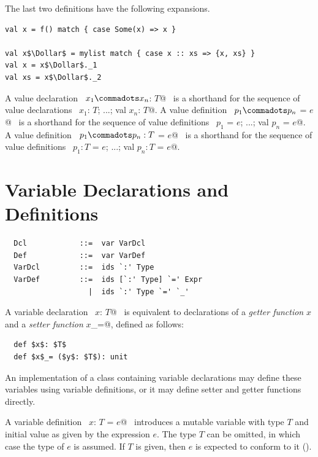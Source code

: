 The last two definitions have the following expansions.
\begin{lstlisting}
val x = f() match { case Some(x) => x }

val x$\Dollar$ = mylist match { case x :: xs => {x, xs} }
val x = x$\Dollar$._1 
val xs = x$\Dollar$._2 
\end{lstlisting}

A value declaration ~\lstinline@val $x_1 \commadots x_n$: $T$@~
is a
shorthand for the sequence of value declarations
~\lstinline@val $x_1$: $T$; ...; val $x_n$: $T$@.
A value definition ~\lstinline@val $p_1 \commadots p_n$ = $e$@~
is a
shorthand for the sequence of value definitions
~\lstinline@val $p_1$ = $e$; ...; val $p_n$ = $e$@.
A value definition ~\lstinline@val $p_1 \commadots p_n: T$ = $e$@~
is a
shorthand for the sequence of value definitions
~\lstinline@val $p_1: T$ = $e$; ...; val $p_n: T$ = $e$@.

\section{Variable Declarations and Definitions}
\label{sec:vardef}

\syntax\begin{lstlisting}
  Dcl            ::=  var VarDcl
  Def            ::=  var VarDef
  VarDcl         ::=  ids `:' Type
  VarDef         ::=  ids [`:' Type] `=' Expr
                   |  ids `:' Type `=' `_'
\end{lstlisting}

A variable declaration ~\lstinline@var $x$: $T$@~ is equivalent to declarations
of a {\em getter function} $x$ and a {\em setter function}
\lstinline@$x$_=@, defined as follows:

\begin{lstlisting}
  def $x$: $T$ 
  def $x$_= ($y$: $T$): unit
\end{lstlisting}

An implementation of a class containing variable declarations
may define these variables using variable definitions, or it may
define setter and getter functions directly.

A variable definition ~\lstinline@var $x$: $T$ = $e$@~ introduces a
mutable variable with type $T$ and initial value as given by the
expression $e$. The type $T$ can be omitted, in which case the type of
$e$ is assumed. If $T$ is given, then $e$ is expected to conform to it
().

